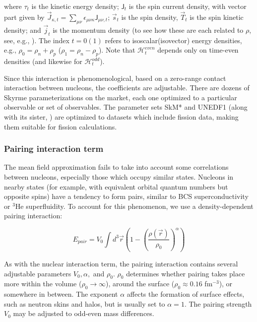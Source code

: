 \noindent where $\tau_t$ is the kinetic energy density; $\mathsf{J}_t$ is the spin current density, with vector part given by $\vec{J}_{\kappa,t} = \sum_{\mu\nu}\epsilon_{\mu\nu\kappa}\mathsf{J}_{\mu\nu,t}$; $\vec{s}_t$ is the spin density, $\vec{T}_t$ is the spin kinetic density; and $\vec{j}_t$ is the momentum density (to see how these are each related to $\rho$, see, e.g., \cite{Bender2003}). The index $t=0(1)$ refers to isoscalar(isovector) energy densities, e.g., $\rho_0 = \rho_n + \rho_p$ ($\rho_1 = \rho_n - \rho_p$). Note that $\mathcal{H}^{even}_t$ depends only on time-even densities (and likewise for $\mathcal{H}^{odd}_t$).

Since this interaction is phenomenological, based on a zero-range contact interaction between nucleons, the coefficients are adjustable. There are dozens of Skyrme parameterizations on the market, each one optimized to a particular observable or set of observables. The parameter sets SkM* \cite{Bartel1982} and UNEDF1 \cite{Kortelainen2012} (along with its sister, {\hfb} \cite{Schunck2015}) are optimized to datasets which include fission data, making them suitable for fission calculations.

\subsubsection{Pairing interaction term}
The mean field approximation fails to take into account some correlations between nucleons, especially those which occupy similar states. Nucleons in nearby states (for example, with equivalent orbital quantum numbers but opposite spins) have a tendency to form pairs, similar to BCS superconductivity or $^3$He superfluidity. To account for this phenomenon, we use a density-dependent pairing interaction:

\begin{equation}
E_{pair} = V_0 \int d^3\vec{r} \left( 1-\left(\frac{\rho(\vec{r})}{\rho_0}\right)^\alpha \right)
\end{equation}

\noindent As with the nuclear interaction term, the pairing interaction contains several adjustable parameters $V_0, \alpha,$ and $\rho_0$. $\rho_0$ determines whether pairing takes place more within the volume ($\rho_0\rightarrow\infty$), around the surface ($\rho_0\approx0.16$ fm$^{-3}$), or somewhere in between. The exponent $\alpha$ affects the formation of surface effects, such as neutron skins and halos, but is usually set to $\alpha=1$. The pairing strength $V_0$ may be adjusted to odd-even mass differences.

